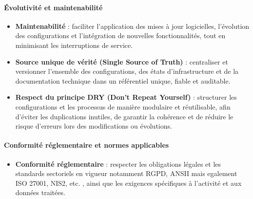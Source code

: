 \paragraph{\textbf{Évolutivité et maintenabilité}}

\begin{itemize}
	\item \textbf{Maintenabilité} : faciliter l'application des mises à jour logicielles, l'évolution des configurations et l'intégration de nouvelles fonctionnalités, tout en minimisant les interruptions de service.
	\item \textbf{Source unique de vérité (Single Source of Truth)} : centraliser et versionner l'ensemble des configurations, des états d'infrastructure et de la documentation technique dans un référentiel unique, fiable et auditable.
	\item \textbf{Respect du principe DRY (Don’t Repeat Yourself)} : structurer les configurations et les processus de manière modulaire et réutilisable, afin d'éviter les duplications inutiles, de garantir la cohérence et de réduire le risque d'erreurs lors des modifications ou évolutions.
\end{itemize}

\paragraph{\textbf{Conformité réglementaire et normes applicables}}

\begin{itemize}
	\item \textbf{Conformité réglementaire} : respecter les obligations légales et les standards sectoriels en vigueur notamment RGPD, ANSII mais egalement ISO 27001, NIS2, etc. , ainsi que les exigences spécifiques à l'activité et aux données traitées.
\end{itemize}